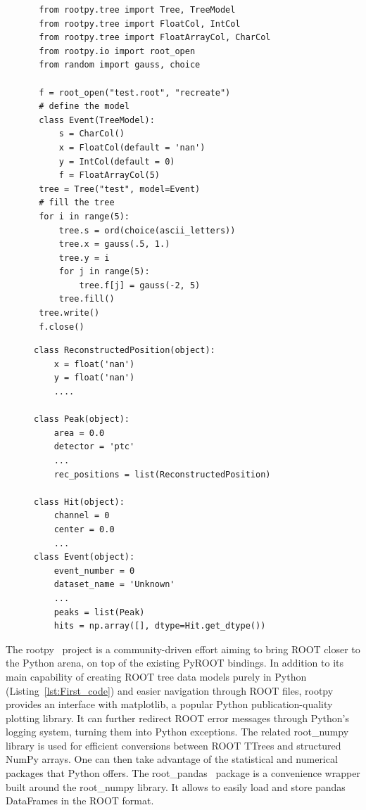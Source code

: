 \documentclass[a4paper]{jpconf}
\begin{document}
\begin{figure}[!h]
 \begin{minipage}{0.5\textwidth}
  \centering
  \begin{verbatim}
 from rootpy.tree import Tree, TreeModel
 from rootpy.tree import FloatCol, IntCol
 from rootpy.tree import FloatArrayCol, CharCol
 from rootpy.io import root_open
 from random import gauss, choice

 f = root_open("test.root", "recreate")
 # define the model
 class Event(TreeModel):
     s = CharCol()
     x = FloatCol(default = 'nan')
     y = IntCol(default = 0)
     f = FloatArrayCol(5)
 tree = Tree("test", model=Event)
 # fill the tree
 for i in range(5):
     tree.s = ord(choice(ascii_letters))
     tree.x = gauss(.5, 1.)
     tree.y = i
     for j in range(5):
         tree.f[j] = gauss(-2, 5)
     tree.fill()
 tree.write()
 f.close()
  \end{verbatim}
  \label{lst:First_code}
 \end{minipage}
 \begin{minipage}{0.5\textwidth}
  \centering
  \begin{verbatim}
class ReconstructedPosition(object):
    x = float('nan') 
    y = float('nan') 
    ....

class Peak(object):
    area = 0.0
    detector = 'ptc'
    ...
    rec_positions = list(ReconstructedPosition)

class Hit(object):
    channel = 0
    center = 0.0
    ...
class Event(object):
    event_number = 0
    dataset_name = 'Unknown'
    ...
    peaks = list(Peak)
    hits = np.array([], dtype=Hit.get_dtype())

    \end{verbatim}
  \label{lst:Second_code}
 \end{minipage}
  \label{lst:representation_examples}
\end{figure}

The rootpy~\cite{noel-dawe-2015-18815} project is a community-driven effort aiming to bring ROOT
closer to the Python arena, on top of the existing PyROOT bindings. In addition to its main capability 
of creating ROOT tree data models purely in Python (Listing~\ref{lst:First_code}) and easier navigation through ROOT files, rootpy provides an 
interface with matplotlib, a popular Python publication-quality plotting library. It can further redirect ROOT error messages through
Python's logging system, turning them into Python exceptions. The related root\_numpy~\cite{noel-dawe-2015-31192}
library is used for efficient conversions between ROOT TTrees and structured NumPy arrays. One can then
take advantage of the statistical and numerical packages that Python offers.
The root\_pandas~\cite{igor-babuschkin-2016-45464} package is a convenience wrapper built around the root\_numpy library. 
It allows to easily load and store pandas DataFrames in the ROOT format.
\end{document}
